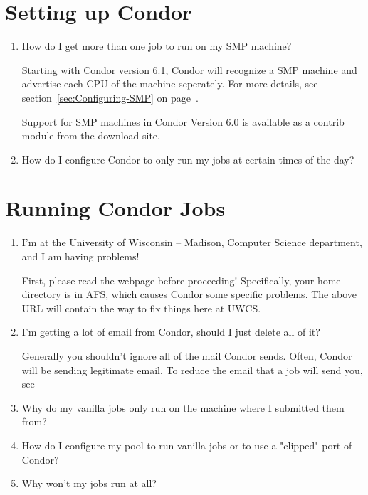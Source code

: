 \section{Setting up Condor}

\begin{enumerate}

\item How do I get more than one job to run on my SMP machine?

Starting with Condor version 6.1, Condor will recognize a SMP machine and advertise each CPU of the
machine seperately.  For more details, see section~\ref{sec:Configuring-SMP} on page~\pageref{sec:Configuring-SMP}.

Support for SMP machines in Condor Version 6.0 is available as a contrib module from the download site.

\item How do I configure Condor to only run my jobs at certain times of the day?


\end{enumerate}

\section{Running Condor Jobs}

\begin{enumerate}

\item{I'm at the University of Wisconsin -- Madison, Computer Science department, and I am having problems!}

First, please read the webpage  before proceeding!
Specifically, your home directory is in AFS, which causes Condor some specific problems.
The above URL will contain the way to fix things here at UWCS.

\item{I'm getting a lot of email from Condor, should I just delete all of it?}

Generally you shouldn't ignore all of the mail Condor sends.  Often, Condor will
be sending legitimate email.  To reduce the email that a job will send you, see

\Todo


\item Why do my vanilla jobs only run on the machine where I submitted them from?

\Todo

\item How do I configure my pool to run vanilla jobs or to use a "clipped" port of Condor?

\Todo

\item Why won't my jobs run at all?

\Todo

\end{enumerate}


